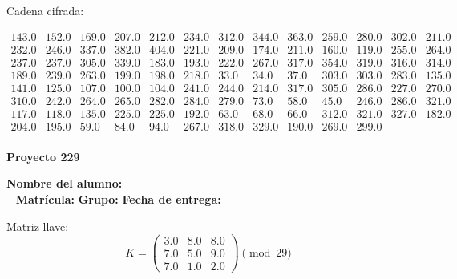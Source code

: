 \documentclass[12pt]{article}
\begin{document}
Cadena cifrada:
\begin{center}
$\begin{array}{lllllllllllll}
143.0 & 152.0 & 169.0 & 207.0 & 212.0 & 234.0 & 312.0 & 344.0 & 363.0 & 259.0 & 280.0 & 302.0 & 211.0\\
232.0 & 246.0 & 337.0 & 382.0 & 404.0 & 221.0 & 209.0 & 174.0 & 211.0 & 160.0 & 119.0 & 255.0 & 264.0\\
237.0 & 237.0 & 305.0 & 339.0 & 183.0 & 193.0 & 222.0 & 267.0 & 317.0 & 354.0 & 319.0 & 316.0 & 314.0\\
189.0 & 239.0 & 263.0 & 199.0 & 198.0 & 218.0 & 33.0 & 34.0 & 37.0 & 303.0 & 303.0 & 283.0 & 135.0\\
141.0 & 125.0 & 107.0 & 100.0 & 104.0 & 241.0 & 244.0 & 214.0 & 317.0 & 305.0 & 286.0 & 227.0 & 270.0\\
310.0 & 242.0 & 264.0 & 265.0 & 282.0 & 284.0 & 279.0 & 73.0 & 58.0 & 45.0 & 246.0 & 286.0 & 321.0\\
117.0 & 118.0 & 135.0 & 225.0 & 225.0 & 192.0 & 63.0 & 68.0 & 66.0 & 312.0 & 321.0 & 327.0 & 182.0\\
204.0 & 195.0 & 59.0 & 84.0 & 94.0 & 267.0 & 318.0 & 329.0 & 190.0 & 269.0 & 299.0\\
\end{array}$
\end{center}

\newpage


\textbf{Proyecto 229}

\textbf{Nombre del alumno:} \underline{\hspace{13cm}}\\\
\vspace{1cm}
\textbf{Matrícula:} \underline{\hspace{4cm}} \hspace{1cm}
\textbf{Grupo:} \underline{\hspace{2cm}}
\textbf{Fecha de entrega:} \underline{\hspace{2cm}}

\medskip

Matriz llave:
\[
K = \begin{pmatrix}
3.0 & 8.0 & 8.0\\
7.0 & 5.0 & 9.0\\
7.0 & 1.0 & 2.0
\end{pmatrix} \pmod{29}
\]
\end{document}
